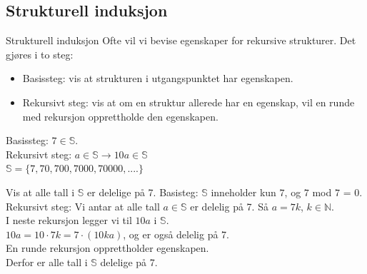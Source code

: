 \subsection{Strukturell induksjon}
\begin{frame}{Strukturell induksjon}
    Ofte vil vi bevise egenskaper for rekursive strukturer. Det gjøres i to steg:
    \begin{itemize}
        \item Basissteg: vis at strukturen i utgangspunktet har egenskapen.
        \item Rekursivt steg: vis at om en struktur allerede har en egenskap, vil en runde med rekursjon opprettholde den egenskapen.
    \end{itemize}
    
    \pause
    \begin{block}{}
        Basissteg: $7 \in \mathbb{S}$.\\
        Rekursivt steg: $a \in \mathbb{S} \rightarrow 10a \in \mathbb{S}$\\
        $\mathbb{S} = \{7, 70, 700, 7000, 70000, ....\}$
    \end{block}
    \begin{block}{Vis at alle tall i $\mathbb{S}$ er delelige på 7.}
        \pause
        Basisteg: $\mathbb{S}$ inneholder kun $7$, og $7$ mod $7$ = 0. \checkmark\\
        \pause
        Rekursivt steg: Vi antar at alle tall $a \in \mathbb{S}$ er delelig på 7. Så $a = 7k$, $k \in \mathbb{N}$.\\
        \pause
        I neste rekursjon legger vi til $10a$ i $\mathbb{S}$.\\
        \pause
        $10a=10 \cdot 7k = 7 \cdot (10ka)$, og er også delelig på 7.\\
        \pause
        En runde rekursjon opprettholder egenskapen. \checkmark\\
        \pause
        Derfor er alle tall i $\mathbb{S}$ delelige på 7.
    \end{block}
\end{frame}

